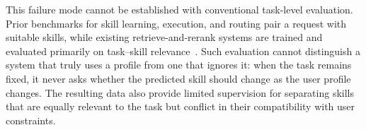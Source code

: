 \documentclass[letterpaper]{article} %
\begin{document}
This failure mode cannot be established with conventional task-level evaluation. Prior benchmarks for skill learning, execution, and routing pair a request with suitable skills, while existing retrieve-and-rerank systems are trained and evaluated primarily on task--skill relevance~\citep{li2026skillsbenchbenchmarkingagentskills,zheng2026skillrouter,wang2026r3skill}. Such evaluation cannot distinguish a system that truly uses a profile from one that ignores it: when the task remains fixed, it never asks whether the predicted skill should change as the user profile changes. The resulting data also provide limited supervision for separating skills that are equally relevant to the task but conflict in their compatibility with user constraints.


\end{document}
